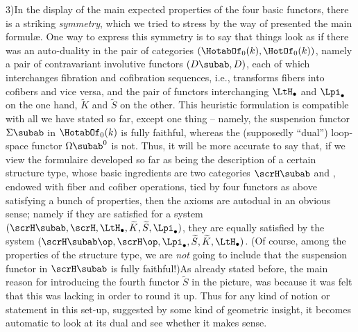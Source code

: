 \begin{remarks}
  3)\enspace In the display of the main expected properties of the
  four basic functors, there is a striking \emph{symmetry}, which we
  tried to stress by the way of presented the main formulæ. One way to
  express this symmetry is to say that things look as if there was an
  auto-duality in the pair of categories $(\HotabOf_0(k),
  \HotOf_0(k))$, namely a pair of contravariant involutive functors
  $(D\subab,D)$, each of which interchanges fibration and
  cofibration sequences, i.e., transforms fibers into cofibers and
  vice versa, and the pair of functors interchanging $\LtH_\bullet$
  and $\Lpi_\bullet$ on the one hand, $\widetilde K$ and $\widetilde
  S$ on the other. This heuristic formulation is compatible with all
  we have stated so far, except one thing -- namely, the suspension
  functor $\Sigma\subab$ in $\HotabOf_0(k)$ is fully faithful, whereas
  the (supposedly ``dual'') loop-space functor $\Omega\subab^0$ is
  not. Thus, it will be more accurate to say that, if we view the
  formulaire developed so far as being the description of a certain
  structure type, whose basic ingredients are two categories
  $\scrH\subab$ and \scrH, endowed with fiber and cofiber operations,
  tied by four functors as above satisfying a bunch of properties,
  then the axioms are autodual in an obvious sense; namely if they are
  satisfied for a system $(\scrH\subab,\scrH,\LtH_\bullet,\widetilde
  K,\widetilde S,\Lpi_\bullet)$, they are equally satisfied by the
  system $(\scrH\subab\op,\scrH\op,\Lpi_\bullet,\widetilde
  S,\widetilde K,\LtH_\bullet)$. (Of course, among the properties of
  the structure type, we are \emph{not} going to include that the
  suspension functor in $\scrH\subab$ is fully faithful!)\enspace As
  already stated before, the main reason for introducing the fourth
  functor $\widetilde S$ in the picture, was because it was felt that
  this was lacking in order to round it up. Thus for any kind of
  notion or statement in this set-up, suggested by some kind of
  geometric insight, it becomes automatic to look at its dual and see
  whether it makes sense.


\end{remarks}
